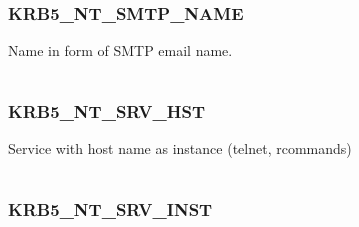 \documentclass[letterpaper,10pt,english]{sphinxmanual}
\begin{document}
\subsubsection{KRB5\_NT\_SMTP\_NAME}
\label{appdev/refs/macros/KRB5_NT_SMTP_NAME:krb5-nt-smtp-name}\label{appdev/refs/macros/KRB5_NT_SMTP_NAME:krb5-nt-smtp-name-data}\label{appdev/refs/macros/KRB5_NT_SMTP_NAME::doc}

\begin{fulllineitems}
\label{appdev/refs/macros/KRB5_NT_SMTP_NAME:KRB5_NT_SMTP_NAME}
\end{fulllineitems}


Name in form of SMTP email name.

\begin{tabulary}{\linewidth}{|L|L|}
\hline

 & 
\\\hline
\end{tabulary}



\subsubsection{KRB5\_NT\_SRV\_HST}
\label{appdev/refs/macros/KRB5_NT_SRV_HST:krb5-nt-srv-hst-data}\label{appdev/refs/macros/KRB5_NT_SRV_HST::doc}\label{appdev/refs/macros/KRB5_NT_SRV_HST:krb5-nt-srv-hst}

\begin{fulllineitems}
\label{appdev/refs/macros/KRB5_NT_SRV_HST:KRB5_NT_SRV_HST}
\end{fulllineitems}


Service with host name as instance (telnet, rcommands)

\begin{tabulary}{\linewidth}{|L|L|}
\hline

 & 
\\\hline
\end{tabulary}



\subsubsection{KRB5\_NT\_SRV\_INST}
\label{appdev/refs/macros/KRB5_NT_SRV_INST:krb5-nt-srv-inst-data}\label{appdev/refs/macros/KRB5_NT_SRV_INST::doc}\label{appdev/refs/macros/KRB5_NT_SRV_INST:krb5-nt-srv-inst}
\end{document}
